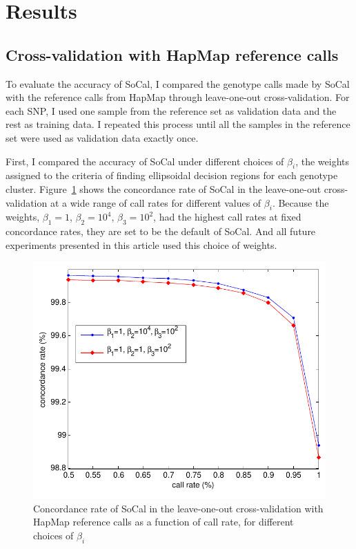 \documentclass{scrartcl}
\begin{document}
\section{Results}

\subsection{Cross-validation with HapMap reference calls}

\par
To evaluate the accuracy of SoCal, I compared the genotype calls made by SoCal
with the reference calls from HapMap through leave-one-out
cross-validation.
For each SNP, I used one sample from the reference set as validation data and
the rest as training data.
I repeated this process until all the samples in the reference set were used
as validation data exactly once.

\par
First, I compared the accuracy of SoCal under different choices of $\beta_i$,
the weights assigned to the criteria of finding ellipsoidal decision regions
for each genotype cluster.
Figure~\ref{fig:result_sh_crvacc} shows the concordance rate of SoCal in the
leave-one-out cross-validation at a wide range of call rates for different
values of $\beta_i$.
Because the weights, $\beta_1=1$, $\beta_2=10^4$, $\beta_3=10^2$,
had the highest call rates at fixed concordance rates, they are set to be the
default of SoCal.
And all future experiments presented in this article used this choice
of weights.

\begin{figure}[H]
\centering
\includegraphics[scale=0.75]
{result_figs/cmp_socal_hapmap/cmp_socal_hapmap_cr_vs_acc.pdf}
\caption{Concordance rate of SoCal in the leave-one-out cross-validation with
HapMap reference calls as a function of call rate, for different choices of
$\beta_i$}
\label{fig:result_sh_crvacc}
\end{figure}
\end{document}
